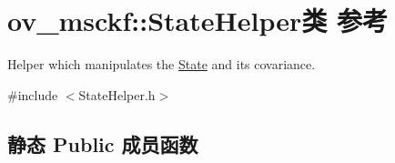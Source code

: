 \hypertarget{classov__msckf_1_1StateHelper}{}\section{ov\+\_\+msckf\+:\+:State\+Helper类 参考}
\label{classov__msckf_1_1StateHelper}


Helper which manipulates the \hyperlink{classov__msckf_1_1State}{State} and its covariance.  




{\ttfamily \#include $<$State\+Helper.\+h$>$}

\subsection*{静态 Public 成员函数}

